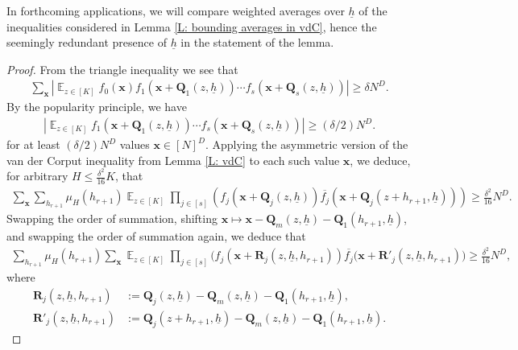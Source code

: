 \documentclass[11pt]{amsart}
\theoremstyle{definition}
\DeclareMathOperator*{\E}{\mathbb{E}}
\newcommand{\bq}{{\mathbf{Q}}}
\newcommand{\q}{{\mathbf{Q}}}
\newcommand{\bx}{{\mathbf{x}}}
\newcommand{\uh}{{\underline{h}}}
\newcommand{\abs}[1]{\mathopen{}\left| #1\mathclose{}\right|}
\newcommand{\brac}[1]{\mathopen{}\left( #1 \mathclose{}\right)}
\newcommand{\NK}[1]{\textcolor{olive}{\textsf{#1}}}
\begin{document}
    {In forthcoming applications, we will compare weighted averages over $\uh$ of the inequalities considered in Lemma \ref{L: bounding averages in vdC}, hence the seemingly redundant presence of $\uh$ in the statement of the lemma.}
    \begin{proof}
     From the triangle inequality we see that
        \begin{align*}
            \sum_{\bx}\abs{\E_{z\in[K]}
            f_0(\bx)f_1(\bx+\q_1(z,\uh))\cdots f_{s}(\bx+\q_s(z,\uh))} \geq \delta N^D.
        \end{align*}     
        By the popularity principle, we have
                \begin{align*}
            \abs{\E_{z\in[K]}
            f_1(\bx+\q_1(z,\uh))\cdots f_{s}(\bx+\q_s(z,\uh))} \geq (\delta/2) N^D.
        \end{align*} 
        for at least $(\delta/2)N^D$ values $\bx\in[N]^D$. 
     Applying the asymmetric version of the van der Corput inequality from Lemma \ref{L: vdC} to each such value $\bx$, 
     we deduce, for arbitrary $H\leq \frac{\delta^2}{16}K$, that
     \begin{align*}
         \sum_{\bx}\sum_{h_{r+1}}\mu_H(h_{r+1})\E_{z\in[K]}\prod_{j\in[s]}\brac{f_j(\bx+\q_j(z,\uh))\overline{f_j}(\bx+\q_j(z+h_{r+1},\uh))} \geq \frac{\delta^2}{16}N^D.
     \end{align*}
     Swapping the order of summation, shifting $\bx\mapsto \bx -{\bq}_m(z, \uh)-\bq_1(h_{r+1}, \uh)$, and swapping the order of summation again, we deduce that
     \begin{align}\label{E: PET reduction intermediate}
         \sum_{h_{r+1}}\mu_H(h_{r+1})\sum_{\bx}\E_{z\in[K]}\prod_{j\in[s]}\big(f_j(\bx+\mathbf{R}_j(z,\uh, h_{r+1}))\overline{f_j}(\bx+\mathbf{R}'_j(z,\uh, h_{r+1})\big) \geq \frac{\delta^2}{16}N^D,
     \end{align}
     where
     \begin{align*}
         \mathbf{R}_j(z,\uh, h_{r+1}) &:= \q_j(z,\uh)-{\bq}_m(z, \uh)-\bq_1(h_{r+1}, \uh),\\
         \mathbf{R}'_j(z,\uh, h_{r+1}) &:= \q_j(z+h_{r+1},\uh)-{\bq}_m(z, \uh)-\bq_1(h_{r+1}, \uh).
     \end{align*}
     

\end{proof}
\end{document}
